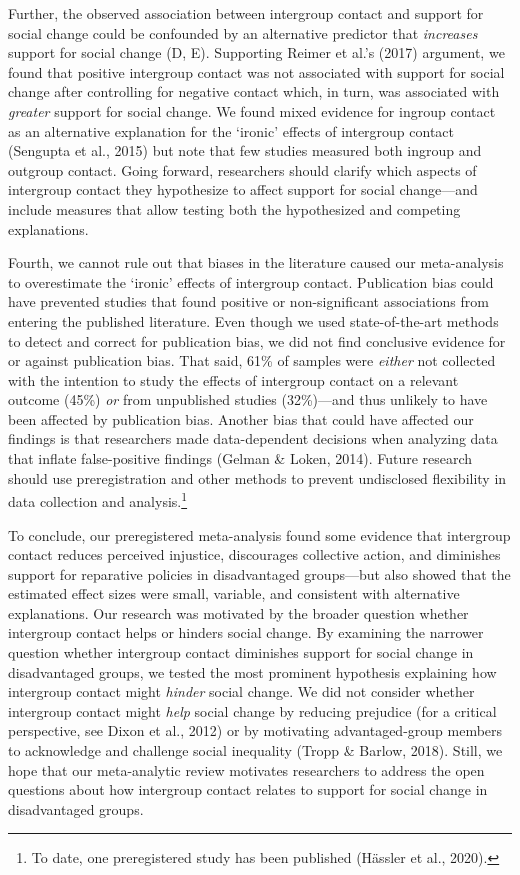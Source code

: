 \documentclass[twocolumn, 11pt, letterpaper]{article}
\begin{document}
Further, the observed association between intergroup contact and support
for social change could be confounded by an alternative predictor that
\emph{increases} support for social change (D, E). Supporting Reimer et
al.'s (2017) argument, we found that positive intergroup contact was not
associated with support for social change after controlling for negative
contact which, in turn, was associated with \emph{greater} support for
social change. We found mixed evidence for ingroup contact as an
alternative explanation for the `ironic' effects of intergroup contact
(Sengupta et al., 2015) but note that few studies measured both ingroup
and outgroup contact. Going forward, researchers should clarify which
aspects of intergroup contact they hypothesize to affect support for
social change---and include measures that allow testing both the
hypothesized and competing explanations.

Fourth, we cannot rule out that biases in the literature caused our
meta-analysis to overestimate the `ironic' effects of intergroup
contact. Publication bias could have prevented studies that found
positive or non-significant associations from entering the published
literature. Even though we used state-of-the-art methods to detect and
correct for publication bias, we did not find conclusive evidence for or
against publication bias. That said, 61\% of samples were \emph{either}
not collected with the intention to study the effects of intergroup
contact on a relevant outcome (45\%) \emph{or} from unpublished studies
(32\%)---and thus unlikely to have been affected by publication bias.
Another bias that could have affected our findings is that researchers
made data-dependent decisions when analyzing data that inflate
false-positive findings (Gelman \& Loken, 2014). Future research should
use preregistration and other methods to prevent undisclosed flexibility
in data collection and analysis.\footnote{To date, one preregistered
  study has been published (Hässler et al., 2020).}

To conclude, our preregistered meta-analysis found some evidence that
intergroup contact reduces perceived injustice, discourages collective
action, and diminishes support for reparative policies in disadvantaged
groups---but also showed that the estimated effect sizes were small,
variable, and consistent with alternative explanations. Our research was
motivated by the broader question whether intergroup contact helps or
hinders social change. By examining the narrower question whether
intergroup contact diminishes support for social change in disadvantaged
groups, we tested the most prominent hypothesis explaining how
intergroup contact might \emph{hinder} social change. We did not
consider whether intergroup contact might \emph{help} social change by
reducing prejudice (for a critical perspective, see Dixon et al., 2012)
or by motivating advantaged-group members to acknowledge and challenge
social inequality (Tropp \& Barlow, 2018). Still, we hope that our
meta-analytic review motivates researchers to address the open questions
about how intergroup contact relates to support for social change in
disadvantaged groups.
\end{document}
